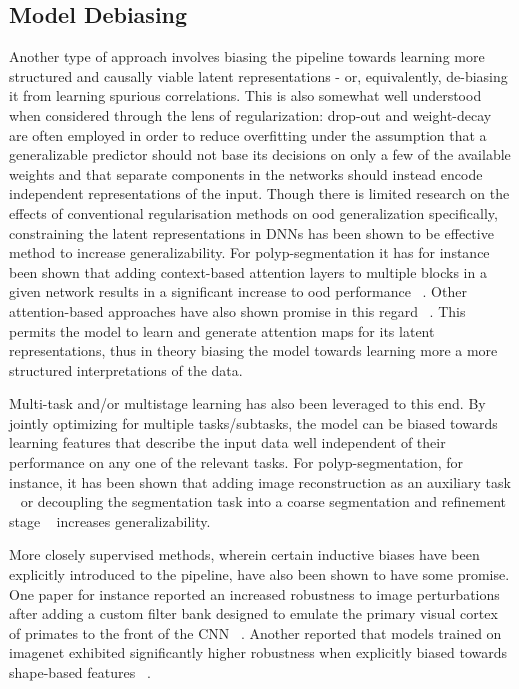 \subsection{Model Debiasing}
Another type of approach involves biasing the pipeline towards learning more structured and causally viable latent representations - or, equivalently, de-biasing it from learning spurious correlations. This is also somewhat well understood when considered through the lens of regularization: drop-out and weight-decay are often employed in order to reduce overfitting under the assumption that a generalizable predictor should not base its decisions on only a few of the available weights and that separate components in the networks should instead encode independent representations of the input. Though there is limited research on the effects of conventional regularisation methods on \gls{ood} generalization specifically, constraining the latent representations in DNNs has been shown to be effective method to increase generalizability. For polyp-segmentation it has for instance been shown that adding context-based attention layers to multiple blocks in a given network results in a significant increase to \gls{ood} performance ~\cite{uacanet}. Other attention-based approaches have also shown promise in this regard ~\cite{attention_generalizability, reverse_attention}. This permits the model to learn and generate attention maps for its latent representations, thus in theory biasing the model towards learning more a more structured interpretations of the data. 

Multi-task and/or multistage learning has also been leveraged to this end. By jointly optimizing for multiple tasks/subtasks, the model can be biased towards learning features that describe the input data well independent of their performance on any one of the relevant tasks. For polyp-segmentation, for instance, it has been shown that adding image reconstruction as an auxiliary task ~\cite{ddanet} or decoupling the segmentation task into a coarse segmentation and refinement stage ~\cite{doubleencdec} increases generalizability. 

More closely supervised methods, wherein certain inductive biases have been explicitly introduced to the pipeline, have also been shown to have some promise. One paper for instance reported an increased robustness to image perturbations after adding a custom filter bank designed to emulate the primary visual cortex of primates to the front of the CNN ~\cite{visual_cortex}. Another reported that models trained on imagenet exhibited significantly higher robustness when explicitly biased towards shape-based features ~\cite{texturebias}. 

